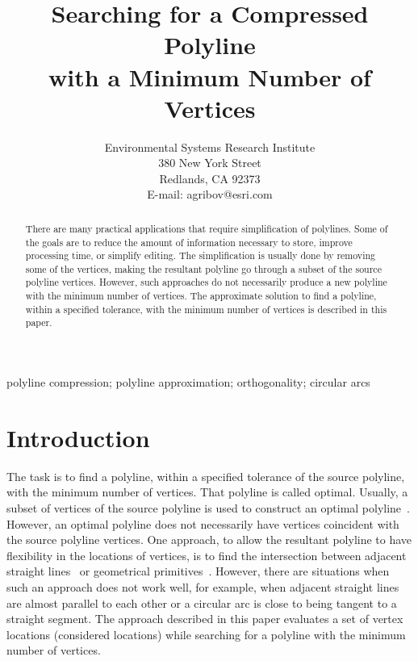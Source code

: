 \documentclass[conference]{IEEEtran}
\begin{document}
\title
{
  Searching for a Compressed Polyline\\
  with a Minimum Number of Vertices
}
\author
{
\IEEEauthorblockA
{
  Environmental Systems Research Institute\\
  380 New York Street\\
  Redlands, CA 92373\\
  E-mail: agribov@esri.com}
}

\maketitle

\begin{abstract}
\boldmath
  There are many practical applications that require simplification of polylines. Some of the goals are to reduce the amount of information necessary to store, improve processing time, or simplify editing. The simplification is usually done by removing some of the vertices, making the resultant polyline go through a subset of the source polyline vertices. However, such approaches do not necessarily produce a new polyline with the minimum number of vertices. The approximate solution to find a polyline, within a specified tolerance, with the minimum number of vertices is described in this paper.
\end{abstract}

\begin{IEEEkeywords}
  polyline compression; polyline approximation; orthogonality; circular arcs
\end{IEEEkeywords}

\section{Introduction}

The task is to find a polyline, within a specified tolerance of the source polyline, with the minimum number of vertices. That polyline is called optimal. Usually, a subset of vertices of the source polyline is used to construct an optimal polyline~\cite{CompressionAlgorithm, CompressionReview}. However, an optimal polyline does not necessarily have vertices coincident with the source polyline vertices. One approach, to allow the resultant polyline to have flexibility in the locations of vertices, is to find the intersection between adjacent straight lines~\cite{PolylineGeneralizationCombinatorical} or geometrical primitives~\cite{PolylineGeneralization}. However, there are situations when such an approach does not work well, for example, when adjacent straight lines are almost parallel to each other or a circular arc is close to being tangent to a straight segment. The approach described in this paper evaluates a set of vertex locations (considered locations) while searching for a polyline with the minimum number of vertices.
\end{document}
